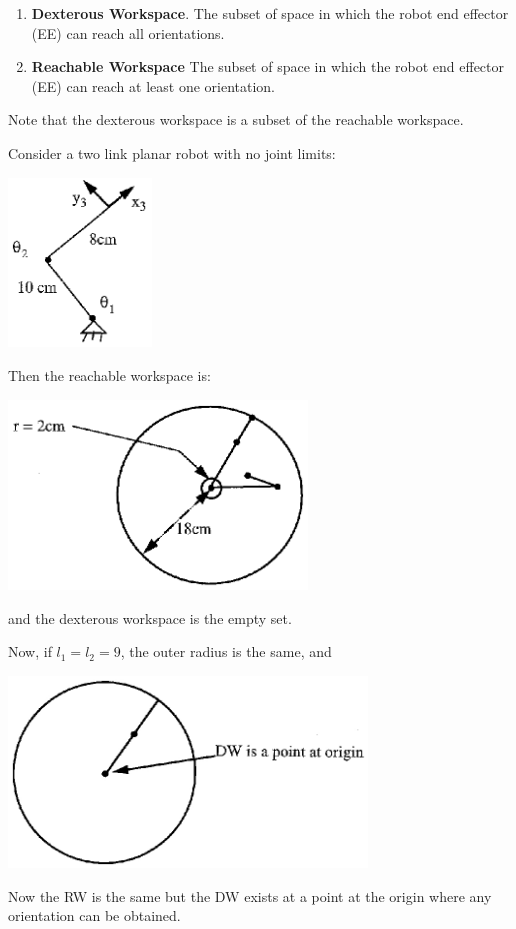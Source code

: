 \begin{enumerate}
	\item {\bf Dexterous Workspace}.  The subset of space in which the robot end effector (EE) can reach all orientations.
	\item {\bf Reachable Workspace}   The subset of space in which the robot end effector (EE) can reach at least one orientation.
\end{enumerate}

Note that the dexterous workspace is a subset of the reachable workspace.

\begin{Example}
Consider a two link planar robot with no joint limits:

\includegraphics[width=1.5in]{figs04/00425.eps}

Then the reachable workspace is:


\includegraphics[width=3.125in]{figs04/00426.eps}

and the dexterous workspace is the empty set.

\newpage


Now, if $l_1 = l_2 = 9$, the outer radius is the same, and


\includegraphics[width=3.75in]{figs04/00427.eps}

Now the RW is the same but the DW exists at a point at the origin where any orientation can be obtained.

\label{workspacedonut}
\end{Example}
